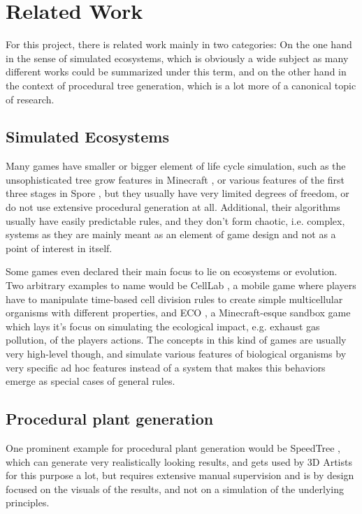 \documentclass[11pt]{scrartcl}
\begin{document}
\section{Related Work}

For this project, there is related work mainly in two categories: On the one hand in the sense of simulated ecosystems, which is obviously a wide subject as many different works could be summarized under this term, and on the other hand in the context of procedural tree generation, which is a lot more of a canonical topic of research.

\subsection{Simulated Ecosystems}

Many games have smaller or bigger element of life cycle simulation, such as the unsophisticated tree grow features in Minecraft \cite{MinecraftTree}, or various features of the first three stages in Spore \cite{Spore}, but they usually have very limited degrees of freedom, or do not use extensive procedural generation at all. Additional, their algorithms usually have easily predictable rules, and they don't form chaotic, i.e. complex, systems as they are mainly meant as an element of game design and not as a point of interest in itself.

Some games even declared their main focus to lie on ecosystems or evolution. Two arbitrary examples to name would be CellLab \cite{CellLab}, a mobile game where players have to manipulate time-based cell division rules to create simple multicellular organisms with different properties, and ECO \cite{EcoGame}, a Minecraft-esque sandbox game which lays it's focus on simulating the ecological impact, e.g. exhaust gas pollution, of the players actions. The concepts in this kind of games are usually very high-level though, and simulate various features of biological organisms by very specific ad hoc features instead of a system that makes this behaviors emerge as special cases of general rules.

\subsection{Procedural plant generation}
One prominent example for procedural plant generation would be SpeedTree \cite{SpeedTree}, which can generate very realistically looking results, and gets used by 3D Artists for this purpose a lot, but requires extensive manual supervision and is by design focused on the visuals of the results, and not on a simulation of the underlying principles. 
\end{document}
